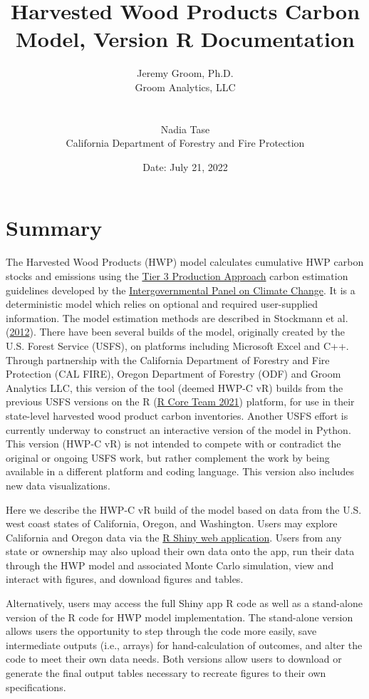 \documentclass[
  openany]{book}
\title{Harvested Wood Products Carbon Model, Version R Documentation}
\author{Jeremy Groom, Ph.D.\\
Groom Analytics, LLC\\
\strut \\
Nadia Tase\\
California Department of Forestry and Fire Protection}
\date{Date: July 21, 2022}
\begin{document}
\frontmatter
\maketitle

\mainmatter
\hypertarget{sum}{%
\chapter{Summary}\label{sum}}

The Harvested Wood Products (HWP) model calculates cumulative HWP carbon
stocks and emissions using the
\href{https://www.ipcc-nggip.iges.or.jp/public/2006gl/pdf/4_Volume4/V4_04_Ch4_Forest_Land.pdf}{Tier
3 Production Approach} carbon estimation guidelines developed by the
\href{https://www.ipcc.ch/}{Intergovernmental Panel on Climate Change}.
It is a deterministic model which relies on optional and required
user-supplied information. The model estimation methods are described in
Stockmann et al. (\protect\hyperlink{ref-stockmann2012}{2012}). There
have been several builds of the model, originally created by the U.S.
Forest Service (USFS), on platforms including Microsoft Excel and C++.
Through partnership with the California Department of Forestry and Fire
Protection (CAL FIRE), Oregon Department of Forestry (ODF) and Groom
Analytics LLC, this version of the tool (deemed HWP-C vR) builds from
the previous USFS versions on the R (\protect\hyperlink{ref-R-base}{R
Core Team 2021}) platform, for use in their state-level harvested wood
product carbon inventories. Another USFS effort is currently underway to
construct an interactive version of the model in Python. This version
(HWP-C vR) is not intended to compete with or contradict the original or
ongoing USFS work, but rather complement the work by being available in
a different platform and coding language. This version also includes new
data visualizations.

Here we describe the HWP-C vR build of the model based on data from the
U.S. west coast states of California, Oregon, and Washington. Users may
explore California and Oregon data via the
\href{https://groomanalyticsllc.shinyapps.io/HWP-C-vR/}{R Shiny web
application}. Users from any state or ownership may also upload their
own data onto the app, run their data through the HWP model and
associated Monte Carlo simulation, view and interact with figures, and
download figures and tables.

Alternatively, users may access the full Shiny app R code as well as a
stand-alone version of the R code for HWP model implementation. The
stand-alone version allows users the opportunity to step through the
code more easily, save intermediate outputs (i.e., arrays) for
hand-calculation of outcomes, and alter the code to meet their own data
needs. Both versions allow users to download or generate the final
output tables necessary to recreate figures to their own specifications.
\end{document}
